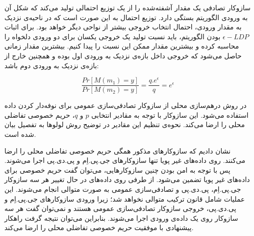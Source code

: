 سازوکار تصادفی یک مقدار آشفته‌شده را از یک توزیع احتمالی تولید می‌کند که شکل آن به ورودی الگوریتم بستگی دارد. توزیع احتمال به این صورت است که در ناحیه‌ی نزدیک به مقدار ورودی، احتمال انتخاب خروجی بیشتر از نواحی دیگر خواهد بود. برای اثبات $\epsilon{-}LDP$ بودن الگوریتم، باید نسبت تولید یک خروجی یکسان برای دو ورودی دلخواه را محاسبه کرده و بیشترین مقدار ممکن این نسبت را پیدا کنیم. بیشترین مقدار زمانی حاصل می‌شود که خروجی داخل بازه‌ی نزدیک به ورودی اول بوده و همچنین خارج از بازه‌ی نزدیک به ورودی دوم باشد: 


$$\frac{Pr[M(m_1) = y]}{Pr[M(m_2) = y]} = \frac{q.e^\epsilon}{q} = e^\epsilon$$



در روش درهم‌سازی محلی از سازوکار تصادفی‌سازی عمومی برای نوفه‌دار کردن داده استفاده می‌شود. این سازوکار با توجه به مقادیر انتخابی $p$ و $q$، حریم خصوصی تفاضلی محلی را ارضا می‌کند. نحوه‌ی تنظیم این مقادیر در توضیح روش لولوها  به تفصیل بیان شده است.


نشان دادیم که سازوکارهای مذکور همگی حریم خصوصی تفاضلی محلی را ارضا می‌کنند. روی داده‌های غیر پویا تنها سازوکارهای جی.پی.اِم و پی.دی.پی اجرا می‌شوند. پس با توجه به امن بودن چنین سازوکارهایی، می‌توان گفت حریم خصوصی برای داده‌های غیر پویا تضمین می‌شود. از طرفی روی داده‌های در حال تغییر هر سه سازوکار جی.پی.اِم، پی.دی.پی و تصادفی‌سازی عمومی به صورت متوالی انجام می‌شوند. این عملیات شامل قانون ترکیب متوالی نخواهد شد؛ زیرا ورودی سازوکارهای جی.پی.اِم و پی.دی.پی، خروجی سازوکار تصادفی‌سازی عمومی هستند و نمی‌‌توان گفت هر سه سازوکار روی یک داده‌ی ورودی اجرا می‌شوند. بنابراین می‌توان نتیجه گرفت راهکار پیشنهادی با موفقیت حریم خصوصی تفاضلی محلی را ارضا می‌کند.








